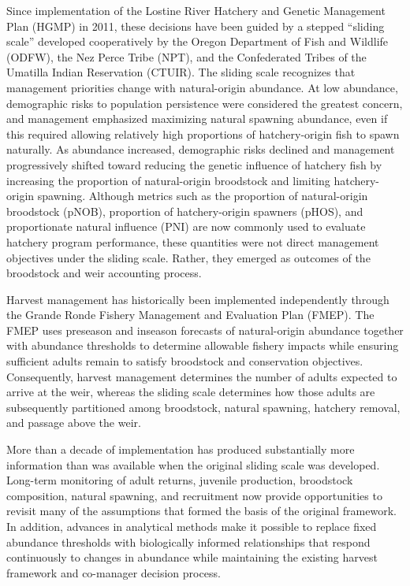 \documentclass[12pt,letterpaper]{article}
\begin{document}
Since implementation of the Lostine River Hatchery and Genetic Management Plan (HGMP) in 2011, these decisions have been guided by a stepped ``sliding scale'' developed cooperatively by the Oregon Department of Fish and Wildlife (ODFW), the Nez Perce Tribe (NPT), and the Confederated Tribes of the Umatilla Indian Reservation (CTUIR). The sliding scale recognizes that management priorities change with natural-origin abundance. At low abundance, demographic risks to population persistence were considered the greatest concern, and management emphasized maximizing natural spawning abundance, even if this required allowing relatively high proportions of hatchery-origin fish to spawn naturally. As abundance increased, demographic risks declined and management progressively shifted toward reducing the genetic influence of hatchery fish by increasing the proportion of natural-origin broodstock and limiting hatchery-origin spawning. Although metrics such as the proportion of natural-origin broodstock (pNOB), proportion of hatchery-origin spawners (pHOS), and proportionate natural influence (PNI) are now commonly used to evaluate hatchery program performance, these quantities were not direct management objectives under the sliding scale. Rather, they emerged as outcomes of the broodstock and weir accounting process.

Harvest management has historically been implemented independently through the Grande Ronde Fishery Management and Evaluation Plan (FMEP). The FMEP uses preseason and inseason forecasts of natural-origin abundance together with abundance thresholds to determine allowable fishery impacts while ensuring sufficient adults remain to satisfy broodstock and conservation objectives. Consequently, harvest management determines the number of adults expected to arrive at the weir, whereas the sliding scale determines how those adults are subsequently partitioned among broodstock, natural spawning, hatchery removal, and passage above the weir.

More than a decade of implementation has produced substantially more information than was available when the original sliding scale was developed. Long-term monitoring of adult returns, juvenile production, broodstock composition, natural spawning, and recruitment now provide opportunities to revisit many of the assumptions that formed the basis of the original framework. In addition, advances in analytical methods make it possible to replace fixed abundance thresholds with biologically informed relationships that respond continuously to changes in abundance while maintaining the existing harvest framework and co-manager decision process.
\end{document}
